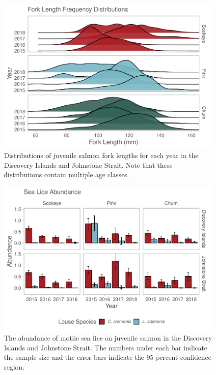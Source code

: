 \documentclass[fleqn,10pt]{wlpeerj} %
\begin{document}
\begin{figure}[H]
\includegraphics[width=0.9\linewidth]{Migration_Observations_Report_files/figure-latex/length-plot-1} \caption{Distributions of juvenile salmon fork lengths for each year in the Discovery Islands and Johnstone Strait. Note that these distributions contain multiple age classes.}\label{fig:length-plot}
\end{figure}

\begin{figure}[H]
\includegraphics[width=0.9\linewidth]{Migration_Observations_Report_files/figure-latex/sealice-abundance-plot-1} \caption{The abundance of motile sea lice on juvenile salmon in the Discovery Islands and Johnstone Strait. The numbers under each bar indicate the sample size and the error bars indicate the 95 percent confidence region.}\label{fig:sealice-abundance-plot}
\end{figure}
\end{document}
